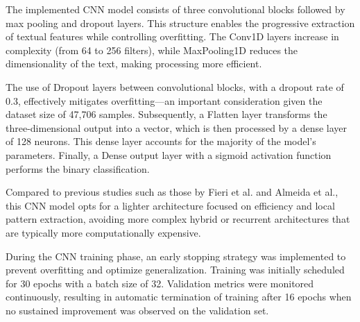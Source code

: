 The implemented CNN model consists of three convolutional blocks followed by max pooling and dropout layers. This structure enables the progressive extraction of textual features while controlling overfitting. The Conv1D layers increase in complexity (from 64 to 256 filters), while MaxPooling1D reduces the dimensionality of the text, making processing more efficient.

The use of Dropout layers between convolutional blocks, with a dropout rate of 0.3, effectively mitigates overfitting—an important consideration given the dataset size of 47,706 samples. Subsequently, a Flatten layer transforms the three-dimensional output into a vector, which is then processed by a dense layer of 128 neurons. This dense layer accounts for the majority of the model’s parameters. Finally, a Dense output layer with a sigmoid activation function performs the binary classification.

Compared to previous studies such as those by Fieri et al. and Almeida et al., this CNN model opts for a lighter architecture focused on efficiency and local pattern extraction, avoiding more complex hybrid or recurrent architectures that are typically more computationally expensive.

During the CNN training phase, an early stopping strategy was implemented to prevent overfitting and optimize generalization. Training was initially scheduled for 30 epochs with a batch size of 32. Validation metrics were monitored continuously, resulting in automatic termination of training after 16 epochs when no sustained improvement was observed on the validation set.